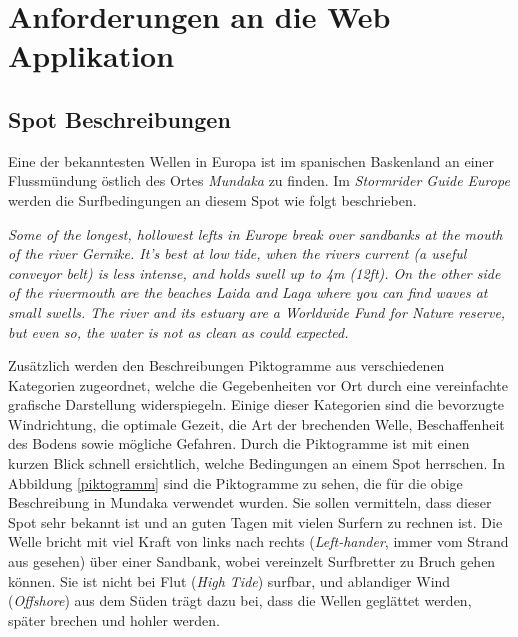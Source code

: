 
\chapter{Anforderungen an die Web Applikation}

\section{Spot Beschreibungen}

Eine der bekanntesten Wellen in Europa ist im spanischen Baskenland an
einer Fluss\-mündung östlich des Ortes \textit{Mundaka} zu finden. Im
\textit{Stormrider Guide Europe} \cite[S.180]{storm_europe_1998}
werden die Surfbedingungen an diesem Spot wie folgt beschrieben.

\vspace{0.2cm}

\textit{Some of the longest, hollowest lefts in Europe break over
  sandbanks at the mouth of the river Gernike. It's best at low tide,
  when the rivers current (a useful conveyor belt) is less intense,
  and holds swell up to 4m (12ft). On the other side of the rivermouth
  are the beaches Laida and Laga where you can find waves at small
  swells. The river and its estuary are a Worldwide Fund for Nature
  reserve, but even so, the water is not as clean as could expected.
}

\vspace{0.2cm}

Zusätzlich werden den Beschreibungen Piktogramme aus verschiedenen
Kategorien zugeordnet, welche die Gegebenheiten vor Ort durch eine
vereinfachte grafische Darstellung widerspiegeln. Einige dieser
Kategorien sind die bevorzugte Windrichtung, die optimale Gezeit, die
Art der brechenden Welle, Beschaffenheit des Bodens sowie mögliche
Gefahren. Durch die Piktogramme ist mit einen kurzen Blick schnell
ersichtlich, welche Bedingungen an einem Spot herrschen. In Abbildung
\ref{piktogramm} sind die Piktogramme zu sehen, die für die obige
Beschreibung in Mundaka verwendet wurden. Sie sollen vermitteln, dass
dieser Spot sehr bekannt ist und an guten Tagen mit vielen Surfern zu
rechnen ist. Die Welle bricht mit viel Kraft von links nach rechts
(\textit{Left-hander}, immer vom Strand aus gesehen) über einer
Sandbank, wobei vereinzelt Surfbretter zu Bruch gehen können.  Sie ist
nicht bei Flut (\textit{High Tide}) surfbar, und ablandiger Wind
(\textit{Offshore}) aus dem Süden trägt dazu bei, dass die Wellen
geglättet werden, später brechen und hohler werden.

